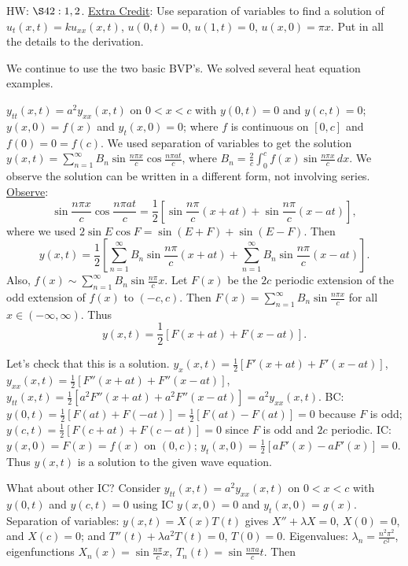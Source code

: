 \documentclass[]{article}
\begin{document}
HW: $\S42: 1,2$. \underline{Extra Credit}: Use separation of variables to find a solution of $u_t(x,t) = k u_{xx} (x,t)$, $u(0,t)=0$, $u(1,t)=0$, $u(x,0)=\pi x$. Put in all the details to the derivation.

We continue to use the two basic BVP's.
We solved several heat equation examples.

\begin{example}
	 $y_{tt}(x,t) = a^2 y_{xx}(x,t)$ on $0<x<c$ with $y(0,t)=0$ and $y(c,t)=0$; $y(x,0)=f(x)$ and $y_t(x,0)=0$; where $f$ is continuous on $[0,c]$ and $f(0)=0=f(c)$. We used separation of variables to get the solution $y(x,t)=\sum_{n=1}^\infty B_n \sin{\frac{n\pi x}{c}} \cos{\frac{n\pi a t}{c}}$, where $B_n = \frac{2}{c} \int_0^c f(x) \sin{\frac{n\pi x}{c}}\, dx$.
	We observe the solution can be written in a different form, not involving series. 
	\underline{Observe}: $$\sin{\frac{n\pi x}{c}}\cos{\frac{n\pi a t}{c}} = \frac{1}{2} \left[ \sin{\frac{n\pi}{c}(x+at)} + \sin{\frac{n\pi}{c}(x-at)} \right],$$ where we used $2\sin{E}\cos{F} = \sin{(E+F)}+\sin{(E-F)}$. Then
	$$y(x,t) = \frac{1}{2} \left[ \sum_{n=1}^\infty B_n \sin{\frac{n\pi}{c}(x+at)} + \sum_{n=1}^\infty B_n \sin{\frac{n\pi}{c}(x-at)} \right].$$
	Also, $f(x) \sim \sum_{n=1}^\infty B_n \sin{\frac{n\pi}{c}x}$.
	Let $F(x)$ be the $2c$ periodic extension of the odd extension of $f(x)$ to $(-c,c)$. Then $F(x) = \sum_{n=1}^\infty B_n \sin{\frac{n\pi x}{c}}$ for all $x\in(-\infty,\infty)$.
	Thus $$y(x,t) = \frac{1}{2} \left[ F(x+at) + F(x-at) \right].$$
	
	Let's check that this is a solution. $y_x(x,t) = \frac{1}{2} \left[ F'(x+at) + F'(x-at) \right]$, $y_{xx}(x,t) = \frac{1}{2} [ F''(x+at) + F''(x-at)]$, $y_{tt}(x,t) = \frac{1}{2} [a^2 F''(x+at) + a^2 F''(x-at)] = a^2 y_{xx}(x,t)$.
	BC: $y(0,t) = \frac{1}{2} [ F(at) + F(-at)] = \frac{1}{2} [ F(at)-F(at)] = 0$ because $F$ is odd; $y(c,t) = \frac{1}{2} [F(c+at) + F(c-at)] = 0$ since $F$ is odd and $2c$ periodic. IC: $y(x,0) = F(x) = f(x)$ on $(0,c)$; $y_t(x,0) = \frac{1}{2} [ aF'(x) - aF'(x) ] =0$.
	Thus $y(x,t)$ is a solution to the given wave equation.
\end{example}
What about other IC? Consider $y_{tt}(x,t) = a^2 y_{xx}(x,t)$ on $0<x<c$ with $y(0,t)$ and $y(c,t)=0$ using IC $y(x,0)=0$ and $y_t(x,0)=g(x)$.
Separation of variables: $y(x,t) = X(x)T(t)$ gives $X''+\lambda X=0$, $X(0)=0$, and $X(c)=0$; and $T''(t) + \lambda a^2 T(t) = 0$, $T(0)=0$.
Eigenvalues: $\lambda_n = \frac{n^2\pi^2}{c^2}$, eigenfunctions $X_n(x)=\sin{\frac{n\pi}{c}x}$, $T_n(t) = \sin{\frac{n\pi a}{c}t}$. Then
\end{document}
